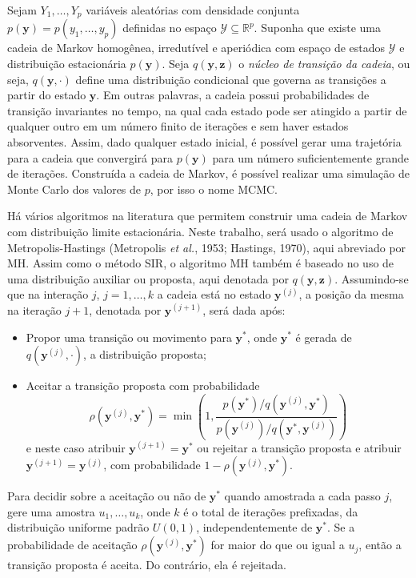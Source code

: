 \documentclass[12pt,reqno,a4paper,oneside]{article}
\begin{document}
Sejam $Y_1, \ldots, Y_p$ variáveis aleatórias com densidade conjunta $p(\bm{y}) = p(y_1, \ldots, y_p)$ definidas no espaço $\mathcal{Y} \subseteq \mathbb{R}^p$. Suponha que existe uma cadeia de Markov homogênea, irredutível e aperiódica com espaço de estados $\mathcal{Y}$ e distribuição estacionária $p(\bm{y})$. Seja $q(\bm{y}, \bm{z})$ o \textit{núcleo de transição da cadeia}, ou seja, $q(\bm{y}, \cdot)$ define uma distribuição condicional que governa as transições a partir do estado $\bm{y}$. Em outras palavras, a cadeia possui probabilidades de transição invariantes no tempo, na qual cada estado pode ser atingido a partir de qualquer outro em um número finito de iterações e sem haver estados absorventes. Assim, dado qualquer estado inicial, é possível gerar uma trajetória para a cadeia que convergirá para $p(\bm{y})$ para um número suficientemente grande de iterações. Construída a cadeia de Markov, é possível realizar uma simulação de Monte Carlo dos valores de $p$, por isso o nome MCMC.

Há vários algoritmos na literatura que permitem construir uma cadeia de Markov com distribuição limite estacionária. Neste trabalho, será usado o algoritmo de Metropolis-Hastings (Metropolis \textit{et al.}, 1953\cite{Metrop1953}; Hastings, 1970\cite{Hastin1970}), aqui abreviado por MH. Assim como o método SIR, o algoritmo MH também é baseado no uso de uma distribuição auxiliar ou proposta, aqui denotada por $q(\bm{y}, \bm{z})$. Assumindo-se que na interação $j$, $j = 1, \ldots, k$ a cadeia está no estado $\bm{y}^{(j)}$, a posição da mesma na iteração $j + 1$, denotada por $\bm{y}^{(j + 1)}$, será dada após:
\begin{itemize}
	\item Propor uma transição ou movimento para $\bm{y}^*$, onde $\bm{y}^*$ é gerada de $q(\bm{y}^{(j)}, \cdot)$, a distribuição proposta;
	\item Aceitar a transição proposta com probabilidade
	\begin{equation}\label{eq:mh_tranprob}
	\rho(\bm{y}^{(j)}, \bm{y}^*) = \min\left(1, \dfrac{p(\bm{y}^*) / q(\bm{y}^{(j)}, \bm{y}^*)}{p(\bm{y}^{(j)}) / q(\bm{y}^*, \bm{y}^{(j)})}\right)
	\end{equation}
	e neste caso atribuir $\bm{y}^{(j + 1)} = \bm{y}^*$ ou rejeitar a transição proposta e atribuir $\bm{y}^{(j + 1)} = \bm{y}^{(j)}$, com probabilidade $1 - \rho(\bm{y}^{(j)}, \bm{y}^*)$.
\end{itemize}

Para decidir sobre a aceitação ou não de $\bm{y}^*$ quando amostrada a cada passo $j$, gere uma amostra $u_1, \ldots, u_k$, onde $k$ é o total de iterações prefixadas, da distribuição uniforme padrão $U(0,1)$, independentemente de $\bm{y}^*$. Se a probabilidade de aceitação $\rho(\bm{y}^{(j)}, \bm{y}^*)$ for maior do que ou igual a $u_j$, então a transição proposta é aceita. Do contrário, ela é rejeitada.
\end{document}

